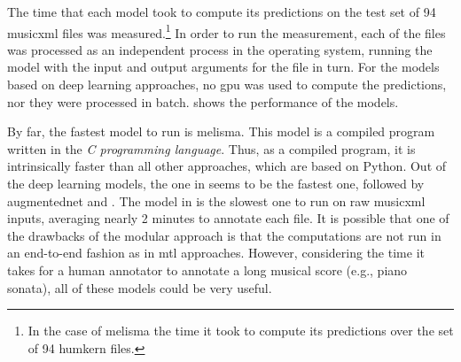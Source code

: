 
The time that each model took to compute its predictions on
the test set of 94 \gls{musicxml} files was
measured.\footnote{In the case of \gls{melisma} the time it
took to compute its predictions over the set of 94
\gls{humkern} files.} In order to run the measurement, each
of the files was processed as an independent process in the
operating system, running the model with the input and
output arguments for the file in turn. For the models based
on deep learning approaches, no \gls{gpu} was used to
compute the predictions, nor they were processed in batch.
 shows the performance of the
models.


By far, the fastest model to run is \gls{melisma}. This
model is a compiled program written in the \emph{C
programming language}. Thus, as a compiled program, it is
intrinsically faster than all other approaches, which are
based on Python. Out of the deep learning models, the one in
\textcite{micchi2021deep} seems to be the fastest one,
followed by \gls{augmentednet} and
\textcite{chen2021attend}. The model in
\textcite{mcleod2021modular} is the slowest one to run on
raw \gls{musicxml} inputs, averaging nearly 2 minutes to
annotate each file. It is possible that one of the drawbacks
of the modular approach is that the computations are not run
in an end-to-end fashion as in \gls{mtl} approaches.
However, considering the time it takes for a human annotator
to annotate a long musical score (e.g., piano sonata), all
of these models could be very useful.

